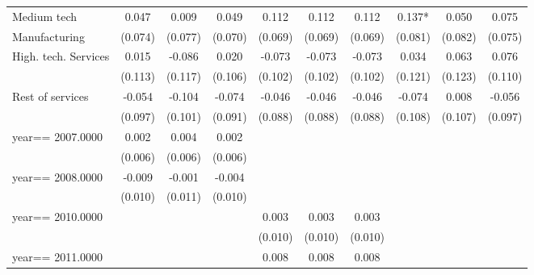 \begin{table}[htbp]
\begin{tabular}{l*{9}{c}}
Medium tech         &       0.047   &       0.009   &       0.049   &       0.112   &       0.112   &       0.112   &       0.137*  &       0.050   &       0.075   \\
Manufacturing       &     (0.074)   &     (0.077)   &     (0.070)   &     (0.069)   &     (0.069)   &     (0.069)   &     (0.081)   &     (0.082)   &     (0.075)   \\
High. tech. Services&       0.015   &      -0.086   &       0.020   &      -0.073   &      -0.073   &      -0.073   &       0.034   &       0.063   &       0.076   \\
                    &     (0.113)   &     (0.117)   &     (0.106)   &     (0.102)   &     (0.102)   &     (0.102)   &     (0.121)   &     (0.123)   &     (0.110)   \\
Rest of services    &      -0.054   &      -0.104   &      -0.074   &      -0.046   &      -0.046   &      -0.046   &      -0.074   &       0.008   &      -0.056   \\
                    &     (0.097)   &     (0.101)   &     (0.091)   &     (0.088)   &     (0.088)   &     (0.088)   &     (0.108)   &     (0.107)   &     (0.097)   \\
year==  2007.0000   &       0.002   &       0.004   &       0.002   &               &               &               &               &               &               \\
                    &     (0.006)   &     (0.006)   &     (0.006)   &               &               &               &               &               &               \\
year==  2008.0000   &      -0.009   &      -0.001   &      -0.004   &               &               &               &               &               &               \\
                    &     (0.010)   &     (0.011)   &     (0.010)   &               &               &               &               &               &               \\
year==  2010.0000   &               &               &               &       0.003   &       0.003   &       0.003   &               &               &               \\
                    &               &               &               &     (0.010)   &     (0.010)   &     (0.010)   &               &               &               \\
year==  2011.0000   &               &               &               &       0.008   &       0.008   &       0.008   &               &               &               \\

\end{tabular}
\end{table}
